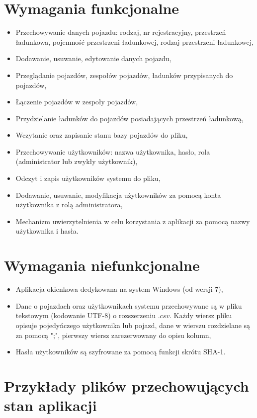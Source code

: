 \section{Wymagania funkcjonalne}
\begin{itemize}
    \item Przechowywanie danych pojazdu: rodzaj, nr rejestracyjny, przestrzeń ładunkowa, pojemność przestrzeni
    ładunkowej, rodzaj przestrzeni ładunkowej,
    \item Dodawanie, usuwanie, edytowanie danych pojazdu,
    \item Przeglądanie pojazdów, zespołów pojazdów, ładunków przypisanych do pojazdów,
    \item Łączenie pojazdów w zespoły pojazdów,
    \item Przydzielanie ładunków do pojazdów posiadających przestrzeń ładunkową,
    \item Wczytanie oraz zapisanie stanu bazy pojazdów do pliku,
    \item Przechowywanie użytkowników: nazwa użytkownika, hasło, rola (administrator lub zwykły użytkownik),
    \item Odczyt i zapis użytkowników systemu do pliku,
    \item Dodawanie, usuwanie, modyfikacja użytkowników za pomocą konta użytkownika z rolą administratora,
    \item Mechanizm uwierzytelnienia w celu korzystania z aplikacji za pomocą nazwy użytkownika i hasła.
\end{itemize}

\section{Wymagania niefunkcjonalne}
\begin{itemize}
    \item Aplikacja okienkowa dedykowana na system Windows (od wersji 7),
    \item Dane o pojazdach oraz użytkownikach systemu przechowywane są w pliku tekstowym (kodowanie UTF-8) o
    rozszerzeniu $.csv$.
    Każdy wiersz pliku opisuje pojedyńczego użytkownika lub pojazd, dane w wierszu rozdzielane są za pomocą ";",
    pierwszy wiersz zarezerwowany do opisu kolumn,
    \item Hasła użytkowników są szyfrowane za pomocą funkcji skrótu SHA-1.
\end{itemize}

\section{Przykłady plików przechowujących stan aplikacji}


